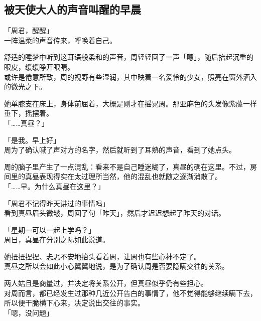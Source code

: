 \subsection{被天使大人的声音叫醒的早晨}

「周君，醒醒」\\

一阵温柔的声音传来，呼唤着自己。

舒适的睡梦中听到这耳语般柔和的声音，周轻轻回了一声「嗯」，随后抬起沉重的眼皮，缓缓睁开眼睛。\\

或许是倦意所致，周的视野有些湿润，其中映着一名爱怜的少女，照亮在窗外洒入的微光之下。

她单膝支在床上，身体前屈着，大概是刚才在摇晃周。那亚麻色的头发像紫藤一样垂下，摇摆着。\\

「……真昼？」

「是我。早上好」\\

周为了确认喊了声对方的名字，然后就听到了耳熟的声音，看到了她点头。

周的脑子里产生了一点混乱：看来不是自己睡迷糊了，真昼的确在这里。不过，房间里的真昼表现得实在太过理所当然，他的混乱也就随之逐渐消散了。\\

「……早。为什么真昼在这里？」

「周君不记得昨天讲过的事情吗」\\

看到真昼眉头微皱，周回了句「昨天」，然后才迟迟想起了昨天的对话。\\

\vspace{2\baselineskip}

「星期一可以一起上学吗？」\\

周日，真昼在分别之际如此说道。

她扭扭捏捏、忐忑不安地抬头看着周，让周也有些心神不定了。\\

真昼之所以会如此小心翼翼地说，是为了确认周是否要隐瞒交往的关系。

两人姑且是商量过，并决定将关系公开，但真昼似乎仍有些担心。\\

对周而言，都已经发生过那种几近公开告白的事情了，他不觉得能够继续瞒下去，所以便干脆横下心来，决定说出交往的事实。\\

「嗯，没问题」

